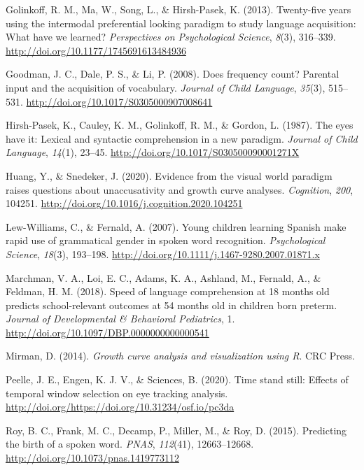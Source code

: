 \documentclass[10pt, letterpaper]{article}
\begin{document}
\leavevmode\hypertarget{ref-Golinkoff2013}{}%
Golinkoff, R. M., Ma, W., Song, L., \& Hirsh-Pasek, K. (2013).
Twenty-five years using the intermodal preferential looking paradigm to
study language acquisition: What have we learned? \emph{Perspectives on
Psychological Science}, \emph{8}(3), 316--339.
\url{http://doi.org/10.1177/1745691613484936}

\leavevmode\hypertarget{ref-Goodman2008}{}%
Goodman, J. C., Dale, P. S., \& Li, P. (2008). Does frequency count?
Parental input and the acquisition of vocabulary. \emph{Journal of Child
Language}, \emph{35}(3), 515--531.
\url{http://doi.org/10.1017/S0305000907008641}

\leavevmode\hypertarget{ref-Hirsh-Pasek1987}{}%
Hirsh-Pasek, K., Cauley, K. M., Golinkoff, R. M., \& Gordon, L. (1987).
The eyes have it: Lexical and syntactic comprehension in a new paradigm.
\emph{Journal of Child Language}, \emph{14}(1), 23--45.
\url{http://doi.org/10.1017/S030500090001271X}

\leavevmode\hypertarget{ref-Huang2020}{}%
Huang, Y., \& Snedeker, J. (2020). Evidence from the visual world
paradigm raises questions about unaccusativity and growth curve
analyses. \emph{Cognition}, \emph{200}, 104251.
\url{http://doi.org/10.1016/j.cognition.2020.104251}

\leavevmode\hypertarget{ref-Lew-Williams2007}{}%
Lew-Williams, C., \& Fernald, A. (2007). Young children learning Spanish
make rapid use of grammatical gender in spoken word recognition.
\emph{Psychological Science}, \emph{18}(3), 193--198.
\url{http://doi.org/10.1111/j.1467-9280.2007.01871.x}

\leavevmode\hypertarget{ref-Marchman2018}{}%
Marchman, V. A., Loi, E. C., Adams, K. A., Ashland, M., Fernald, A., \&
Feldman, H. M. (2018). Speed of language comprehension at 18 months old
predicts school-relevant outcomes at 54 months old in children born
preterm. \emph{Journal of Developmental \& Behavioral Pediatrics}, 1.
\url{http://doi.org/10.1097/DBP.0000000000000541}

\leavevmode\hypertarget{ref-Mirman2014}{}%
Mirman, D. (2014). \emph{Growth curve analysis and visualization using
R}. CRC Press.

\leavevmode\hypertarget{ref-Peelle2020}{}%
Peelle, J. E., Engen, K. J. V., \& Sciences, B. (2020). Time stand
still: Effects of temporal window selection on eye tracking analysis.
\url{http://doi.org/https://doi.org/10.31234/osf.io/pc3da}

\leavevmode\hypertarget{ref-Roy2015}{}%
Roy, B. C., Frank, M. C., Decamp, P., Miller, M., \& Roy, D. (2015).
Predicting the birth of a spoken word. \emph{PNAS}, \emph{112}(41),
12663--12668. \url{http://doi.org/10.1073/pnas.1419773112}
\end{document}
